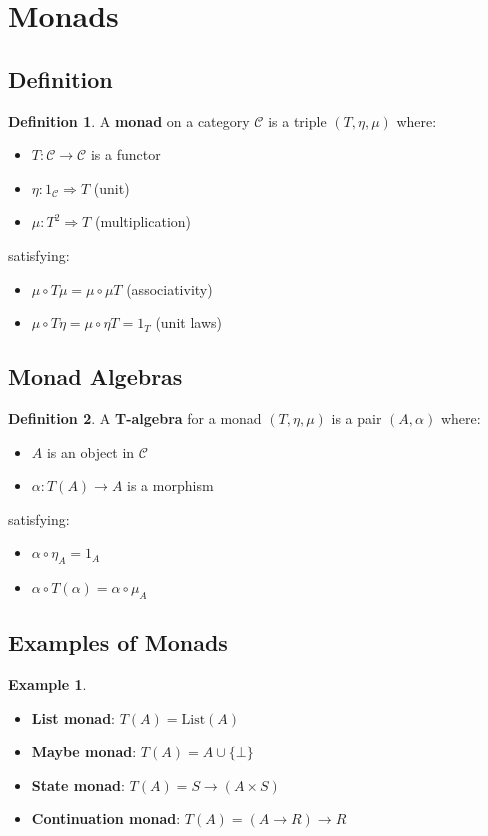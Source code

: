 \documentclass[11pt]{article}
\theoremstyle{definition}
\newtheorem{definition}{Definition}[section]
\newtheorem{example}{Example}[section]
\begin{document}
\section{Monads}

\subsection{Definition}
\begin{definition}
A \textbf{monad} on a category $\mathcal{C}$ is a triple $(T, \eta, \mu)$ where:
\begin{itemize}
    \item $T: \mathcal{C} \to \mathcal{C}$ is a functor
    \item $\eta: 1_{\mathcal{C}} \Rightarrow T$ (unit)
    \item $\mu: T^2 \Rightarrow T$ (multiplication)
\end{itemize}
satisfying:
\begin{itemize}
    \item $\mu \circ T\mu = \mu \circ \mu T$ (associativity)
    \item $\mu \circ T\eta = \mu \circ \eta T = 1_T$ (unit laws)
\end{itemize}
\end{definition}

\subsection{Monad Algebras}
\begin{definition}
A \textbf{T-algebra} for a monad $(T, \eta, \mu)$ is a pair $(A, \alpha)$ where:
\begin{itemize}
    \item $A$ is an object in $\mathcal{C}$
    \item $\alpha: T(A) \to A$ is a morphism
\end{itemize}
satisfying:
\begin{itemize}
    \item $\alpha \circ \eta_A = 1_A$
    \item $\alpha \circ T(\alpha) = \alpha \circ \mu_A$
\end{itemize}
\end{definition}

\subsection{Examples of Monads}
\begin{example}
\begin{itemize}
    \item \textbf{List monad}: $T(A) = \text{List}(A)$
    \item \textbf{Maybe monad}: $T(A) = A \cup \{\bot\}$
    \item \textbf{State monad}: $T(A) = S \to (A \times S)$
    \item \textbf{Continuation monad}: $T(A) = (A \to R) \to R$
\end{itemize}
\end{example}
\end{document}
